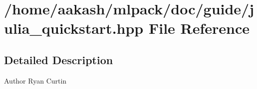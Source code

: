 \section{/home/aakash/mlpack/doc/guide/julia\+\_\+quickstart.hpp File Reference}
\label{julia__quickstart_8hpp}


\subsection{Detailed Description}
\begin{DoxyAuthor}{Author}
Ryan Curtin 
\end{DoxyAuthor}
